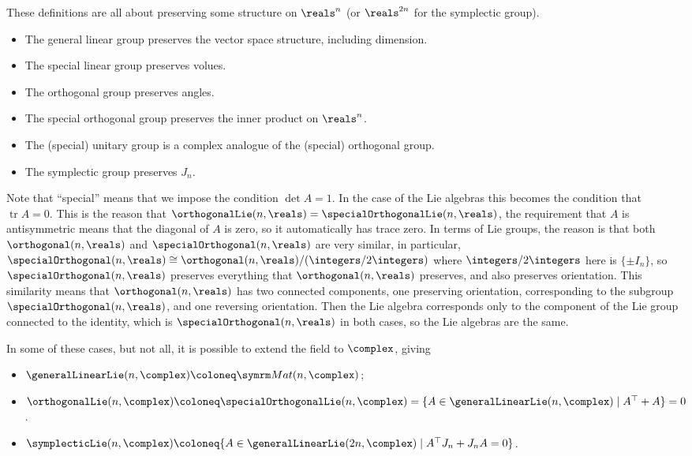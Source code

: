 \documentclass[fleqn]{NotesClass}
\newcommand{\isomorphic}{\cong}
\newcommand{\trans}{{\top}}
\DeclareMathOperator{\tr}{tr}
\begin{document}
    These definitions are all about preserving some structure on \(\reals^n\) (or \(\reals^{2n}\) for the symplectic group).
    \begin{itemize}
        \item The general linear group preserves the vector space structure, including dimension.
        \item The special linear group preserves volues.
        \item The orthogonal group preserves angles.
        \item The special orthogonal group preserves the inner product on \(\reals^n\).
        \item The (special) unitary group is a complex analogue of the (special) orthogonal group.
        \item The symplectic group preserves \(J_n\).
    \end{itemize}
    
    Note that \enquote{special} means that we impose the condition \(\det A = 1\).
    In the case of the Lie algebras this becomes the condition that \(\tr A = 0\).
    This is the reason that \(\orthogonalLie(n, \reals) = \specialOrthogonalLie(n, \reals)\), the requirement that \(A\) is antisymmetric means that the diagonal of \(A\) is zero, so it automatically has trace zero.
    In terms of Lie groups, the reason is that both \(\orthogonal(n, \reals)\) and \(\specialOrthogonal(n, \reals)\) are very similar, in particular, \(\specialOrthogonal(n, \reals) \isomorphic \orthogonal(n, \reals)/(\integers/2\integers)\) where \(\integers/2\integers\) here is \(\{\pm I_n\}\), so \(\specialOrthogonal(n, \reals)\) preserves everything that \(\orthogonal(n, \reals)\) preserves, and also preserves orientation.
    This similarity means that \(\orthogonal(n, \reals)\) has two connected components, one preserving orientation, corresponding to the subgroup \(\specialOrthogonal(n, \reals)\), and one reversing orientation.
    Then the Lie algebra corresponds only to the component of the Lie group connected to the identity, which is \(\specialOrthogonal(n, \reals)\) in both cases, so the Lie algebras are the same.
    
    In some of these cases, but not all, it is possible to extend the field to \(\complex\), giving
    \begin{itemize}
        \item \(\generalLinearLie(n, \complex) \coloneq \matrices{n}{\complex}\);
        \item \(\orthogonalLie(n, \complex) \coloneq \specialOrthogonalLie(n, \complex) = \{A \in \generalLinearLie(n, \complex) \mid A^{\trans} + A\} = 0\).
        \item \(\symplecticLie(n, \complex) \coloneq \{A \in \generalLinearLie(2n, \complex) \mid A^{\trans}J_n + J_n A = 0\}\).
    \end{itemize}
    
\end{document}
